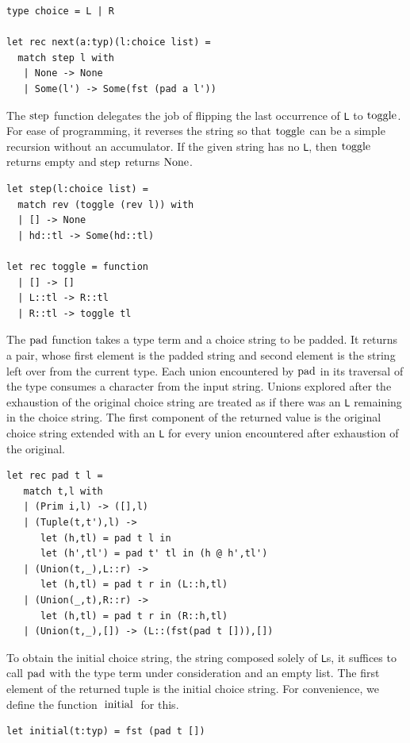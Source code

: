 \documentclass[a4paper,english]{lipics-v2019}
\renewcommand{\L}{{\tt L}\xspace}
\newcommand{\Ls}{{\tt L}s\xspace}
\renewcommand{\c}[1]{\ensuremath{\text{\lstinline{#1}}}\xspace}
\begin{document}
\begin{lstlisting}
type choice = L | R

let rec next(a:typ)(l:choice list) = 
  match step l with
   | None -> None
   | Some(l') -> Some(fst (pad a l'))
\end{lstlisting}

\noindent
The \c{step} function delegates the job of flipping the last occurrence of
\L to \c{toggle}. For ease of programming, it reverses the string so that
\c{toggle} can be a simple recursion without an accumulator.  If the given
string has no \L, then \c{toggle} returns empty and \c{step} returns
\c{None}.

\begin{lstlisting}
let step(l:choice list) =
  match rev (toggle (rev l)) with
  | [] -> None
  | hd::tl -> Some(hd::tl)

let rec toggle = function
  | [] -> []    
  | L::tl -> R::tl
  | R::tl -> toggle tl
\end{lstlisting}

\noindent The \c{pad} function takes a type term and a choice string to be
padded. It returns a pair, whose first element is the padded string and second
element is the string left over from the current type. Each union encountered
by \c{pad} in its traversal of the type consumes a character from the input
string. Unions explored after the exhaustion of the original choice string are
treated as if there was an \L remaining in the choice string. The first
component of the returned value is the original choice string
extended with an \L for every union encountered after exhaustion of the original.

\begin{lstlisting}
let rec pad t l =
   match t,l with
   | (Prim i,l) -> ([],l)
   | (Tuple(t,t'),l) -> 
      let (h,tl) = pad t l in
      let (h',tl') = pad t' tl in (h @ h',tl')
   | (Union(t,_),L::r) -> 
      let (h,tl) = pad t r in (L::h,tl)
   | (Union(_,t),R::r) -> 
      let (h,tl) = pad t r in (R::h,tl)
   | (Union(t,_),[]) -> (L::(fst(pad t [])),[])
\end{lstlisting}

\noindent
To obtain the initial choice string, the string composed solely of \Ls, it
suffices to call \c{pad} with the type term under consideration and an empty
list. The first element of the returned tuple is the initial choice
string. For convenience, we define the function \c{initial} for this.

\begin{lstlisting}
let initial(t:typ) = fst (pad t [])
\end{lstlisting}
\end{document}
